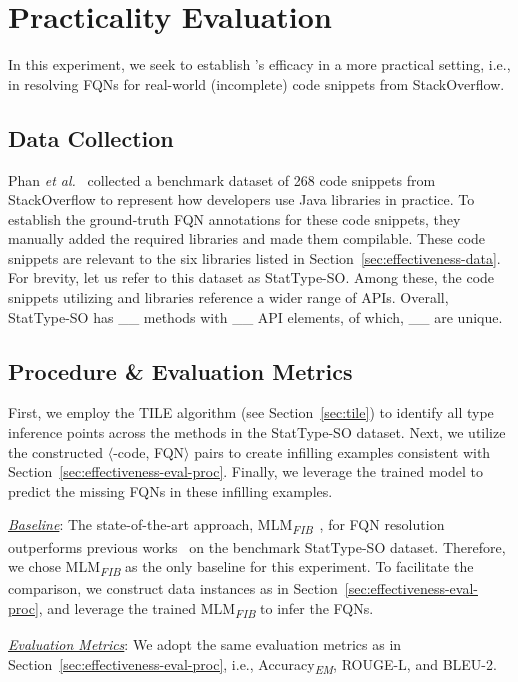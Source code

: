 \section{Practicality Evaluation}
\label{sec:eval}

In this experiment, we seek to establish \tool's efficacy in a more practical setting, i.e., in resolving FQNs for real-world (incomplete) code snippets from StackOverflow.

\subsection{Data Collection}
Phan {\em et al.}~\cite{icse18} collected a benchmark dataset of 268 code snippets from StackOverflow to represent how developers use Java libraries in practice. To establish the ground-truth FQN annotations for these code snippets, they manually added the required libraries and made them compilable. These code snippets are relevant to the six libraries listed in Section~\ref{sec:effectiveness-data}. For brevity, let us refer to this dataset as StatType-SO. Among these, the code snippets utilizing  and  libraries reference a wider range of APIs. Overall, StatType-SO has \_\_ methods with \_\_ API elements, of which, \_\_ are unique.

\subsection{Procedure \& Evaluation Metrics}
First, we employ the TILE algorithm (see Section~\ref{sec:tile}) to identify all type inference points across the methods in the StatType-SO dataset. Next, we utilize the constructed $\langle$\blank-code, FQN$\rangle$ pairs to create infilling examples consistent with Section~\ref{sec:effectiveness-eval-proc}. Finally, we leverage the trained \tool model to predict the missing FQNs in these infilling examples.

\underline{\textit{Baseline}}: The state-of-the-art approach,
MLM\textsubscript{\textit{FIB}}~\cite{prompt-ase22}, for FQN
resolution outperforms previous works~\cite{coster-ase19, snr-icse22}
on the benchmark StatType-SO dataset. Therefore, we chose
MLM\textsubscript{\textit{FIB}} as the only baseline for this
experiment. To facilitate the comparison, we construct data instances
as in Section~\ref{sec:effectiveness-eval-proc}, and leverage the
trained MLM\textsubscript{\textit{FIB}} to infer the FQNs.

\underline{\textit{Evaluation Metrics}}: We adopt the same evaluation metrics as in Section~\ref{sec:effectiveness-eval-proc}, i.e., Accuracy\textsubscript{\textit{EM}}, ROUGE-L, and BLEU-2.

